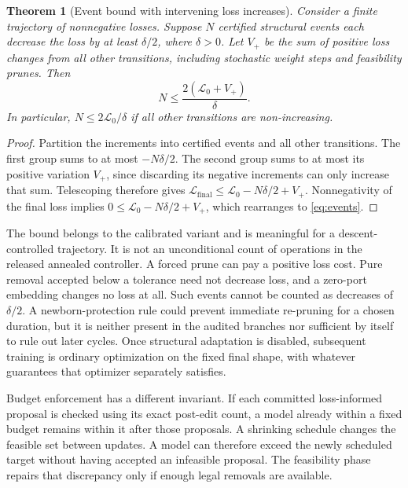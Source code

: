 \documentclass[10pt]{article}
\theoremstyle{paper}
\newtheorem{theorem}{Theorem}[section]
\newcommand{\Lcal}{\mathcal L}
\begin{document}
\begin{theorem}[Event bound with intervening loss increases]
\label{thm:events}
Consider a finite trajectory of nonnegative losses. Suppose $N$ certified structural events each decrease the loss by at least $\delta/2$, where $\delta>0$. Let $V_+$ be the sum of positive loss changes from all other transitions, including stochastic weight steps and feasibility prunes. Then
\begin{equation}
N\le\frac{2(\Lcal_0+V_+)}\delta.
\label{eq:events}
\end{equation}
In particular, $N\le2\Lcal_0/\delta$ if all other transitions are non-increasing.
\end{theorem}
\begin{proof}
Partition the increments into certified events and all other transitions. The first group sums to at most $-N\delta/2$. The second group sums to at most its positive variation $V_+$, since discarding its negative increments can only increase that sum. Telescoping therefore gives $\Lcal_{\mathrm{final}}\le\Lcal_0-N\delta/2+V_+$. Nonnegativity of the final loss implies $0\le\Lcal_0-N\delta/2+V_+$, which rearranges to \cref{eq:events}.
\end{proof}

The bound belongs to the calibrated variant and is meaningful for a descent-controlled trajectory. It is not an unconditional count of operations in the released annealed controller. A forced prune can pay a positive loss cost. Pure removal accepted below a tolerance need not decrease loss, and a zero-port embedding changes no loss at all. Such events cannot be counted as decreases of $\delta/2$. A newborn-protection rule could prevent immediate re-pruning for a chosen duration, but it is neither present in the audited branches nor sufficient by itself to rule out later cycles. Once structural adaptation is disabled, subsequent training is ordinary optimization on the fixed final shape, with whatever guarantees that optimizer separately satisfies.

Budget enforcement has a different invariant. If each committed loss-informed proposal is checked using its exact post-edit count, a model already within a fixed budget remains within it after those proposals. A shrinking schedule changes the feasible set between updates. A model can therefore exceed the newly scheduled target without having accepted an infeasible proposal. The feasibility phase repairs that discrepancy only if enough legal removals are available.
\end{document}
